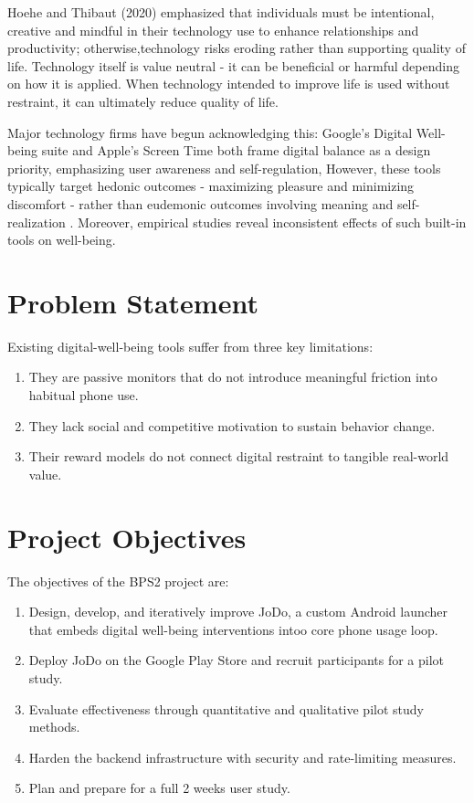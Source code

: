 \documentclass[12pt,a4paper]{report}
\begin{document}
Hoehe and Thibaut (2020) \citep{hoehe2020going} emphasized that individuals must be intentional, creative and mindful in their technology use to enhance relationships and productivity;
otherwise,technology risks eroding rather than supporting quality of life. Technology itself is value neutral - it can be beneficial or harmful depending on how it is applied. When technology intended to improve life is used without restraint, it can ultimately reduce quality of life.

Major technology firms have begun acknowledging this: Google's Digital Well-being suite and Apple's Screen Time both frame digital balance as a design priority, emphasizing user awareness and self-regulation, However, these tools typically target hedonic outcomes - maximizing pleasure and minimizing discomfort - rather than eudemonic outcomes involving meaning and self-realization \citep{hutmacher2022personalization} . Moreover, empirical studies reveal inconsistent effects of such built-in tools on well-being.

\section{Problem Statement}
Existing digital-well-being tools suffer from three key limitations:
\begin{enumerate}
    \item They are passive monitors that do not introduce meaningful friction into habitual phone use.
    \item They lack social and competitive motivation to sustain behavior change.
    \item Their reward models do not connect digital restraint to tangible real-world value.
\end{enumerate}
\section{Project Objectives}
The objectives of the BPS2 project are:
\begin{enumerate}
    \item Design, develop, and iteratively improve JoDo, a custom Android launcher that embeds digital well-being interventions intoo core phone usage loop.
    \item Deploy JoDo on the Google Play Store and recruit participants for a pilot study.
    \item Evaluate effectiveness through quantitative and qualitative pilot study methods.
    \item Harden the backend infrastructure with security and rate-limiting measures.
    \item Plan and prepare for a full 2 weeks user study.
\end{enumerate}
\end{document}
